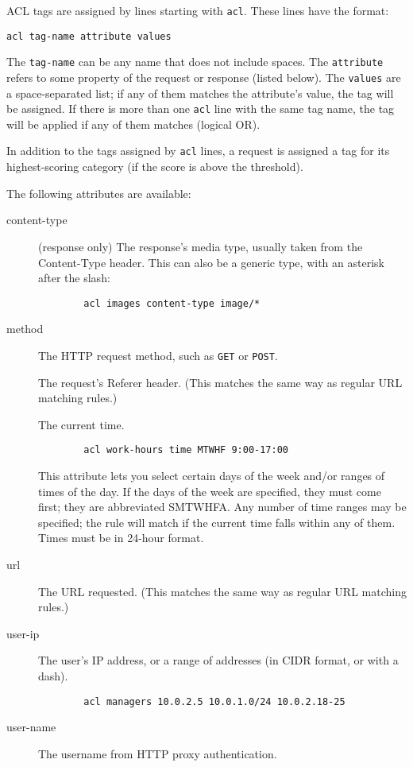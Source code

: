 \documentclass{article}
\begin{document}
ACL tags are assigned by lines starting with \verb"acl". 
These lines have the format:

\begin{verbatim}
acl tag-name attribute values
\end{verbatim}

The \verb"tag-name" can be any name that does not include spaces.
The \verb"attribute" refers to some property of the request or response (listed below).
The \verb"values" are a space-separated list; if any of them matches the attribute's value, the tag will be assigned.
If there is more than one \verb"acl" line with the same tag name, the tag will be applied if any of them matches (logical OR).

In addition to the tags assigned by \verb"acl" lines, a request is assigned a tag for its highest-scoring category
(if the score is above the threshold).

The following attributes are available:

\begin{description}

	\item[content-type] (response only) The response's media type, usually taken from the Content-Type header.
		This can also be a generic type, with an asterisk after the slash:

		\begin{verbatim}
		acl images content-type image/*
		\end{verbatim}

	\item[method] The HTTP request method, such as \verb"GET" or \verb"POST".

	\itme[referer] The request's Referer header. (This matches the same way as regular URL matching rules.)

	\itme[time] The current time.

		\begin{verbatim}
		acl work-hours time MTWHF 9:00-17:00
		\end{verbatim}

		This attribute lets you select certain days of the week and/or ranges of times of the day.
		If the days of the week are specified, they must come first; they are abbreviated SMTWHFA.
		Any number of time ranges may be specified; the rule will match if the current time falls within any of them.
		Times must be in 24-hour format.

	\item[url] The URL requested. (This matches the same way as regular URL matching rules.)

	\item[user-ip] The user's IP address, or a range of addresses (in CIDR format, or with a dash).

		\begin{verbatim}
		acl managers 10.0.2.5 10.0.1.0/24 10.0.2.18-25
		\end{verbatim}

	\item[user-name] The username from HTTP proxy authentication.
	
\end{description}
\end{document}
